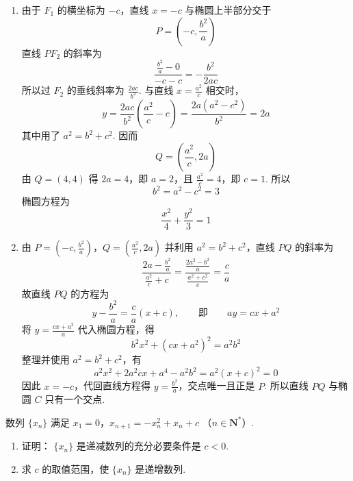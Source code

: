 \begin{solution}
\begin{enumerate}
\item 由于 \(F_1\) 的横坐标为 \(-c\)，直线 \(x=-c\) 与椭圆上半部分交于
\[
P=\left(-c,\frac{b^2}{a}\right)
\]
直线 \(PF_2\) 的斜率为
\[
\frac{\frac{b^2}{a}-0}{-c-c}=-\frac{b^2}{2ac}
\]
所以过 \(F_2\) 的垂线斜率为 \(\frac{2ac}{b^2}\). 与直线 \(x=\frac{a^2}{c}\) 相交时，
\[
y=\frac{2ac}{b^2}\left(\frac{a^2}{c}-c\right)
=\frac{2a(a^2-c^2)}{b^2}=2a
\]
其中用了 \(a^2=b^2+c^2\). 因而
\[
Q=\left(\frac{a^2}{c},2a\right)
\]
由 \(Q=(4,4)\) 得 \(2a=4\)，即 \(a=2\)，且 \(\frac{a^2}{c}=4\)，即 \(c=1\). 所以
\[
b^2=a^2-c^2=3
\]
椭圆方程为
\[
\frac{x^2}{4}+\frac{y^2}{3}=1
\]
\item 由
\(P=\left(-c,\frac{b^2}{a}\right)\)，\(Q=\left(\frac{a^2}{c},2a\right)\)
并利用 \(a^2=b^2+c^2\)，直线 \(PQ\) 的斜率为
\[
\frac{2a-\frac{b^2}{a}}{\frac{a^2}{c}+c}
=\frac{\frac{2a^2-b^2}{a}}{\frac{a^2+c^2}{c}}
=\frac{c}{a}
\]
故直线 \(PQ\) 的方程为
\[
y-\frac{b^2}{a}=\frac{c}{a}(x+c),
\qquad\text{即}\qquad
ay=cx+a^2
\]
将 \(y=\frac{cx+a^2}{a}\) 代入椭圆方程，得
\[
b^2x^2+(cx+a^2)^2=a^2b^2
\]
整理并使用 \(a^2=b^2+c^2\)，有
\[
a^2x^2+2a^2cx+a^4-a^2b^2
=a^2(x+c)^2=0
\]
因此 \(x=-c\)，代回直线方程得 \(y=\frac{b^2}{a}\)，交点唯一且正是 \(P\). 所以直线 \(PQ\) 与椭圆 \(C\) 只有一个交点.
\end{enumerate}
\end{solution}

\begin{problem}
数列 \(\{x_{n}\}\) 满足 \(x_{1} = 0\)，\(x_{n + 1} = -x_{n}^{2} + x_{n} + c \) （\(n \in \mathbf{N}^{*}\)）.

\begin{enumerate}
\item 证明： \(\{x_{n}\}\) 是递减数列的充分必要条件是 \(c < 0\).
\item 求 \(c\) 的取值范围，使 \( \{x_{n}\} \) 是递增数列.
\end{enumerate}
\end{problem}

